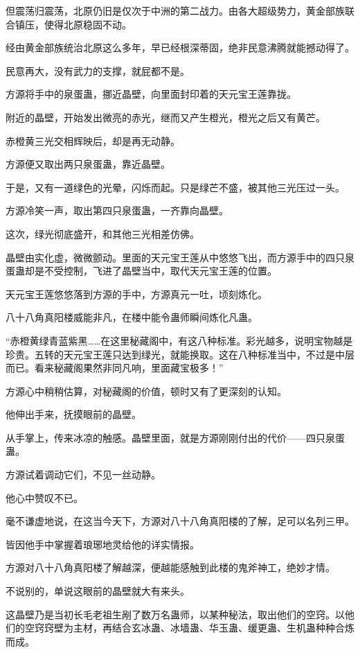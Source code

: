 \begin{this_body}
但震荡归震荡，北原仍旧是仅次于中洲的第二战力。由各大超级势力，黄金部族联合镇压，使得北原稳固不动。

经由黄金部族统治北原这么多年，早已经根深蒂固，绝非民意沸腾就能撼动得了。

民意再大，没有武力的支撑，就屁都不是。

方源将手中的泉蛋蛊，挪近晶壁，向里面封印着的天元宝王莲靠拢。

附近的晶壁，开始发出微亮的赤光，继而又产生橙光，橙光之后又有黄芒。

赤橙黄三光交相辉映后，却是再无动静。

方源便又取出两只泉蛋蛊，靠近晶壁。

于是，又有一道绿色的光晕，闪烁而起。只是绿芒不盛，被其他三光压过一头。

方源冷笑一声，取出第四只泉蛋蛊，一齐靠向晶壁。

这次，绿光彻底盛开，和其他三光相差仿佛。

晶壁由实化虚，微微颤动。里面的天元宝王莲从中悠悠飞出，而方源手中的四只泉蛋蛊却是不受控制，飞进了晶壁当中，取代天元宝王莲的位置。

天元宝王莲悠悠落到方源的手中，方源真元一吐，顷刻炼化。

八十八角真阳楼威能非凡，在楼中能令蛊师瞬间炼化凡蛊。

“赤橙黄绿青蓝紫黑……在这里秘藏阁中，有这八种标准。彩光越多，说明宝物越是珍贵。五转的天元宝王莲只达到绿光，就能换取。这在八种标准当中，不过是中层而已。看来秘藏阁果然非同凡响，里面藏宝极多！”

方源心中稍稍估算，对秘藏阁的价值，顿时又有了更深刻的认知。

他伸出手来，抚摸眼前的晶壁。

从手掌上，传来冰凉的触感。晶壁里面，就是方源刚刚付出的代价——四只泉蛋蛊。

方源试着调动它们，不见一丝动静。

他心中赞叹不已。

毫不谦虚地说，在这当今天下，方源对八十八角真阳楼的了解，足可以名列三甲。

皆因他手中掌握着琅琊地灵给他的详实情报。

方源对八十八角真阳楼了解越深，便越能感触到此楼的鬼斧神工，绝妙才情。

不说别的，单说这眼前的晶壁就大有来头。

这晶壁乃是当初长毛老祖生剐了数万名蛊师，以某种秘法，取出他们的空窍。以他们的空窍窍壁为主材，再结合玄冰蛊、冰墙蛊、华玉蛊、缓更蛊、生机蛊种种合炼而成。


\end{this_body}
